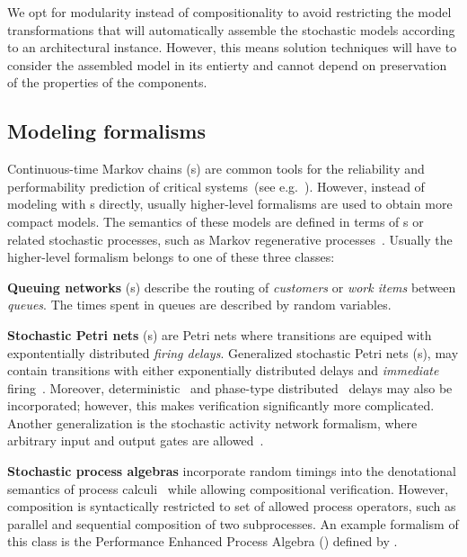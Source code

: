 We opt for modularity instead of compositionality to avoid restricting the model transformations that will automatically assemble the stochastic models according to an architectural  instance. However, this means solution techniques will have to consider the assembled model in its entierty and cannot depend on preservation of the properties of the components.

\subsection{Modeling formalisms}

Continuous-time Markov chains (s) are common tools for the reliability and performability prediction of critical systems~(see e.g.~\cite{Reibman89markov}). However, instead of modeling with s directly, usually higher-level formalisms are used to obtain more compact models. The semantics of these models are defined in terms of s or related stochastic processes, such as Markov regenerative processes~\citep{Logothetis95mrm,Telek96mrm}. Usually the higher-level formalism belongs to one of these three classes:

\newpara \textbf{Queuing networks} (s) describe the routing of \emph{customers} or \emph{work items} between \emph{queues}. The times spent in queues are described by random variables. 

\newpara \textbf{Stochastic Petri nets} (s) are Petri nets where transitions are equiped with expontentially distributed \emph{firing delays}. Generalized stochastic Petri nets (s), may contain transitions with either exponentially distributed delays and \emph{immediate} firing~\citep{Marsan84gspn}. Moreover, deterministic~\citep{Logothetis95mrm} and phase-type distributed~\citep{Longo13phasetype} delays may also be incorporated; however, this makes verification significantly more complicated. Another generalization is the stochastic activity network formalism, where arbitrary input and output gates are allowed~\citep{Sanders01san}.

\newpara \textbf{Stochastic process algebras} incorporate random timings into the denotational semantics of process calculi~\citep{Hermanns02algebra} while allowing compositional verification. However, composition is syntactically restricted to set of allowed process operators, such as parallel and sequential composition of two subprocesses. An example formalism of this class is the Performance Enhanced Process Algebra () defined by \citet{Hillston95pepa}.

